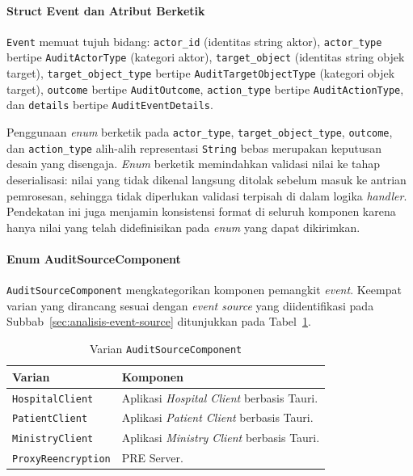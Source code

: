 \paragraph{Struct Event dan Atribut Berketik}

\texttt{Event} memuat tujuh bidang: \texttt{actor\_id} (identitas string aktor),
\texttt{actor\_type} bertipe \texttt{AuditActorType} (kategori aktor),
\texttt{target\_object} (identitas string objek target), \texttt{target\_object\_type}
bertipe \texttt{AuditTargetObjectType} (kategori objek target), \texttt{outcome}
bertipe \texttt{AuditOutcome}, \texttt{action\_type} bertipe \texttt{AuditActionType},
dan \texttt{details} bertipe \texttt{AuditEventDetails}.

Penggunaan \textit{enum} berketik pada \texttt{actor\_type},
\texttt{target\_object\_type}, \texttt{outcome}, dan \texttt{action\_type}
alih-alih representasi \texttt{String} bebas merupakan keputusan desain yang
disengaja. \textit{Enum} berketik memindahkan validasi nilai ke tahap
deserialisasi: nilai yang tidak dikenal langsung ditolak sebelum masuk ke
antrian pemrosesan, sehingga tidak diperlukan validasi terpisah di dalam logika
\textit{handler}. Pendekatan ini juga menjamin konsistensi format di seluruh
komponen karena hanya nilai yang telah didefinisikan pada \textit{enum} yang
dapat dikirimkan.

\paragraph{Enum AuditSourceComponent}

\texttt{AuditSourceComponent} mengkategorikan komponen pemangkit \textit{event}.
Keempat varian yang dirancang sesuai dengan \textit{event source} yang
diidentifikasi pada Subbab~\ref{sec:analisis-event-source} ditunjukkan pada
Tabel~\ref{tab:enum-source-component}.

\begin{table}[htbp]
\centering
\caption{Varian \texttt{AuditSourceComponent}}
\label{tab:enum-source-component}
\renewcommand{\arraystretch}{1.3}
\begin{tabular}{|p{4.5cm}|p{7.5cm}|}
\hline
\textbf{Varian} & \textbf{Komponen} \\
\hline
\texttt{HospitalClient} & Aplikasi \textit{Hospital Client} berbasis Tauri. \\
\hline
\texttt{PatientClient} & Aplikasi \textit{Patient Client} berbasis Tauri. \\
\hline
\texttt{MinistryClient} & Aplikasi \textit{Ministry Client} berbasis Tauri. \\
\hline
\texttt{ProxyReencryption} & PRE Server. \\
\hline
\end{tabular}
\end{table}

